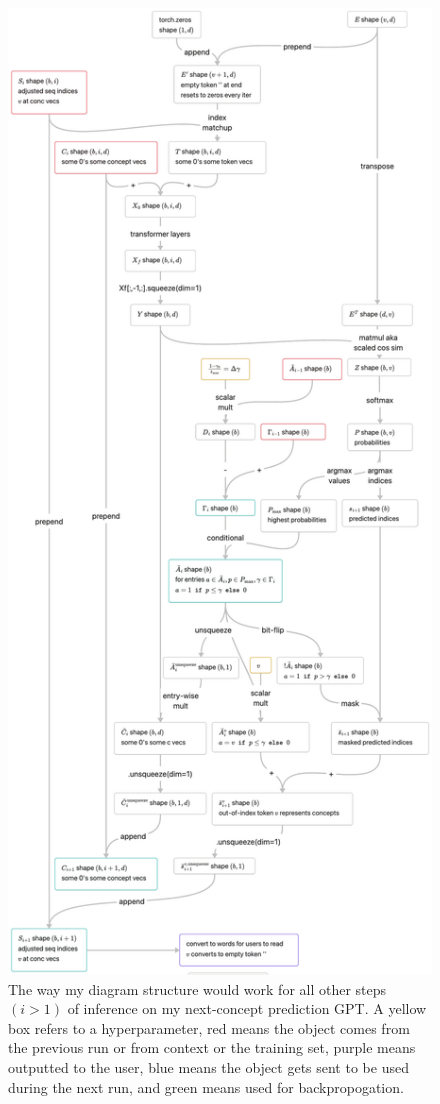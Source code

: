 \documentclass{article}
\begin{document}
\newpage
\begin{figure}[!htb]
    \centering
    \includegraphics[height=0.9\textheight]{NCP_i>1_inf.png}
    \caption{The way my diagram structure would work for all other steps $(i>1)$ of inference on my next-concept prediction GPT. A yellow box refers to a hyperparameter, red means the object comes from the previous run or from context or the training set, purple means outputted to the user, blue means the object gets sent to be used during the next run, and green means used for backpropogation.}
    \label{fig:ncp_i>1_inf}
\end{figure}
\end{document}
